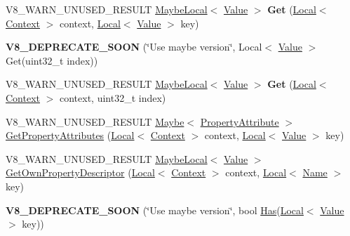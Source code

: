 \begin{DoxyCompactItemize}
V8\+\_\+\+W\+A\+R\+N\+\_\+\+U\+N\+U\+S\+E\+D\+\_\+\+R\+E\+S\+U\+LT \mbox{\hyperlink{classv8_1_1MaybeLocal}{Maybe\+Local}}$<$ \mbox{\hyperlink{classv8_1_1Value}{Value}} $>$ {\bfseries Get} (\mbox{\hyperlink{classv8_1_1Local}{Local}}$<$ \mbox{\hyperlink{classv8_1_1Context}{Context}} $>$ context, \mbox{\hyperlink{classv8_1_1Local}{Local}}$<$ \mbox{\hyperlink{classv8_1_1Value}{Value}} $>$ key)
\item 
\mbox{\label{classv8_1_1Object_ac27f1b680e53d4c9c879aac3c7380202}} 
{\bfseries V8\+\_\+\+D\+E\+P\+R\+E\+C\+A\+T\+E\+\_\+\+S\+O\+ON} (\char`\"{}Use maybe version\char`\"{}, Local$<$ \mbox{\hyperlink{classv8_1_1Value}{Value}} $>$ Get(uint32\+\_\+t index))
\item 
\mbox{\label{classv8_1_1Object_ac1fcfcfedaf66775c46b53cb1804b949}} 
V8\+\_\+\+W\+A\+R\+N\+\_\+\+U\+N\+U\+S\+E\+D\+\_\+\+R\+E\+S\+U\+LT \mbox{\hyperlink{classv8_1_1MaybeLocal}{Maybe\+Local}}$<$ \mbox{\hyperlink{classv8_1_1Value}{Value}} $>$ {\bfseries Get} (\mbox{\hyperlink{classv8_1_1Local}{Local}}$<$ \mbox{\hyperlink{classv8_1_1Context}{Context}} $>$ context, uint32\+\_\+t index)
\item 
V8\+\_\+\+W\+A\+R\+N\+\_\+\+U\+N\+U\+S\+E\+D\+\_\+\+R\+E\+S\+U\+LT \mbox{\hyperlink{classv8_1_1Maybe}{Maybe}}$<$ \mbox{\hyperlink{namespacev8_a05f25f935e108a1ea2d150e274602b87}{Property\+Attribute}} $>$ \mbox{\hyperlink{classv8_1_1Object_ae5c97a596bcb634c50605a574358a9c6}{Get\+Property\+Attributes}} (\mbox{\hyperlink{classv8_1_1Local}{Local}}$<$ \mbox{\hyperlink{classv8_1_1Context}{Context}} $>$ context, \mbox{\hyperlink{classv8_1_1Local}{Local}}$<$ \mbox{\hyperlink{classv8_1_1Value}{Value}} $>$ key)
\item 
V8\+\_\+\+W\+A\+R\+N\+\_\+\+U\+N\+U\+S\+E\+D\+\_\+\+R\+E\+S\+U\+LT \mbox{\hyperlink{classv8_1_1MaybeLocal}{Maybe\+Local}}$<$ \mbox{\hyperlink{classv8_1_1Value}{Value}} $>$ \mbox{\hyperlink{classv8_1_1Object_a96c87fe175a5f66b156bb9fa472e480d}{Get\+Own\+Property\+Descriptor}} (\mbox{\hyperlink{classv8_1_1Local}{Local}}$<$ \mbox{\hyperlink{classv8_1_1Context}{Context}} $>$ context, \mbox{\hyperlink{classv8_1_1Local}{Local}}$<$ \mbox{\hyperlink{classv8_1_1Name}{Name}} $>$ key)
\item 
\mbox{\label{classv8_1_1Object_adbaa619d9f0588470c1e88532949da65}} 
{\bfseries V8\+\_\+\+D\+E\+P\+R\+E\+C\+A\+T\+E\+\_\+\+S\+O\+ON} (\char`\"{}Use maybe version\char`\"{}, bool \mbox{\hyperlink{classv8_1_1Object_a57d4819c2cc13715ed22dd23cdc84d7c}{Has}}(\mbox{\hyperlink{classv8_1_1Local}{Local}}$<$ \mbox{\hyperlink{classv8_1_1Value}{Value}} $>$ key))

\end{DoxyCompactItemize}
